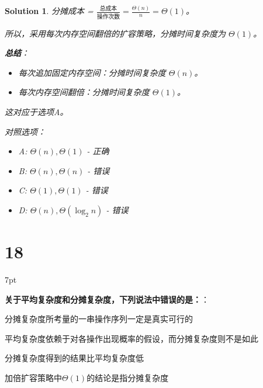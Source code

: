 \documentclass[UTF8]{report}
\newtheorem{solution}{Solution}
\theoremstyle{MyLineTheoremStyle} %
\theoremstyle{MyBlockTheoremStyle} %
\theoremstyle{MySubsubsectionStyle} %
\newenvironment{graybox}{%
        \def\FrameCommand{%
        \hspace{1pt}%
        {\color{gray}\small \vrule width 2pt}%
        {\color{graybox_color}\vrule width 4pt}%
        \colorbox{graybox_color}%
        }%
        \MakeFramed{\advance\hsize-\width\FrameRestore}%
        \noindent\hspace{-4.55pt}%
        \begin{adjustwidth}{}{7pt}%
        \vspace{2pt}\vspace{2pt}%
        }
        {%
        \vspace{2pt}\end{adjustwidth}\endMakeFramed%
        }
\begin{document}
\begin{solution}
分摊成本 = $\frac{\text{总成本}}{\text{操作次数}} = \frac{\Theta(n)}{n} = \Theta(1)$。

所以，采用每次内存空间翻倍的扩容策略，分摊时间复杂度为 $\Theta(1)$。

\textbf{总结}：
\begin{itemize}
    \item 每次追加固定内存空间：分摊时间复杂度 $\Theta(n)$。
    \item 每次内存空间翻倍：分摊时间复杂度 $\Theta(1)$。
\end{itemize}
这对应于选项A。

对照选项：
\begin{itemize}
    \item A: $\Theta(n), \Theta(1)$ - 正确
    \item B: $\Theta(n), \Theta(n)$ - 错误
    \item C: $\Theta(1), \Theta(1)$ - 错误
    \item D: $\Theta(n), \Theta(\log_{2}n)$ - 错误
\end{itemize}
\end{solution}

\section*{18}

\begin{graybox}
\textbf{关于平均复杂度和分摊复杂度，下列说法中错误的是：}：
\begin{circledenum}
    \item 分摊复杂度所考量的一串操作序列一定是真实可行的
    \item 平均复杂度依赖于对各操作出现概率的假设，而分摊复杂度则不是如此
    \item 分摊复杂度得到的结果比平均复杂度低
    \item 加倍扩容策略中$\Theta(1)$的结论是指分摊复杂度
\end{circledenum}
\end{graybox}
\end{document}
